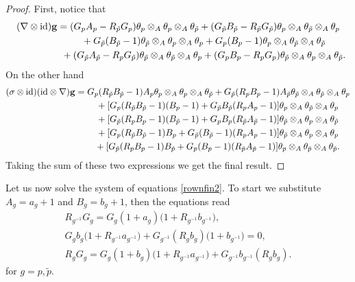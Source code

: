 \documentclass[10pt,a4paper]{amsart}
\numberwithin{equation}{section}
\newcommand{\ip}{{\tilde{p}}}
\begin{document}
\begin{proof}First, notice that
\begin{gather*}
(\nabla\otimes\mathrm{id}){\bf g} =
(G_pA_p - R_\ip G_p)\theta_p\otimes_A\theta_p\otimes_A\theta_\ip +(G_\ip B_\ip-R_\ip G_\ip)\theta_p\otimes_A\theta_\ip\otimes_A\theta_p \\
\hphantom{(\nabla\otimes\mathrm{id}){\bf g} =}{}
+G_\ip(B_\ip-1)\theta_\ip\otimes_A\theta_p\otimes_A\theta_p+G_p(B_p-1)\theta_p\otimes_A\theta_\ip\otimes_A\theta_\ip\\
\hphantom{(\nabla\otimes\mathrm{id}){\bf g} =}{} +(G_\ip A_\ip-R_pG_\ip)\theta_\ip\otimes_A\theta_\ip\otimes_A\theta_p+(G_p B_p-R_pG_p )\theta_\ip\otimes_A\theta_p\otimes_A\theta_\ip.
\end{gather*}
On the other hand
\begin{gather*}
(\sigma\otimes\mathrm{id})(\mathrm{id}\otimes\nabla){\bf g} =
G_p(R_\ip B_\ip -1)A_p\theta_p\otimes_A\theta_p\otimes_A\theta_\ip+G_\ip(R_p B_p -1)A_\ip\theta_\ip\otimes_A\theta_\ip\otimes_A\theta_p \\
\hphantom{(\sigma\otimes\mathrm{id})(\mathrm{id}\otimes\nabla){\bf g} =}{}
+ [G_p(R_\ip B_\ip -1)(B_p-1)+G_\ip B_\ip(R_p A_p -1) ]\theta_p\otimes_A\theta_\ip\otimes_A\theta_p \\
\hphantom{(\sigma\otimes\mathrm{id})(\mathrm{id}\otimes\nabla){\bf g} =}{}
+ [G_\ip(R_p B_p -1)(B_\ip-1)+G_p B_p(R_\ip A_\ip -1) ]\theta_\ip\otimes_A\theta_p\otimes_A\theta_\ip \\
\hphantom{(\sigma\otimes\mathrm{id})(\mathrm{id}\otimes\nabla){\bf g} =}{}
+ [G_p(R_\ip B_\ip-1) B_p+G_\ip (B_\ip-1)(R_p A_p -1) ]\theta_\ip\otimes_A\theta_p\otimes_A\theta_p \\
\hphantom{(\sigma\otimes\mathrm{id})(\mathrm{id}\otimes\nabla){\bf g} =}{}
+ [G_\ip(R_p B_p-1) B_\ip+G_p(B_p-1)(R_\ip A_\ip -1) ]\theta_p\otimes_A\theta_\ip\otimes_A\theta_\ip.
\end{gather*}
Taking the sum of these two expressions we get the final result.
\end{proof}



Let us now solve the system of equations \eqref{rownfin2}. To start we substitute $A_g=a_g+1$ and $B_g=b_g+1$, then the equations
read
\begin{gather}
R_{g^{-1}}G_g=G_g(1+a_g)\big(1+R_{g^{-1}}b_{g^{-1}}\big),\nonumber\\
G_gb_g\big(1+R_{g^{-1}}a_{g^{-1}}\big)+G_{g^{-1}}(R_gb_g)\big(1+b_{g^{-1}}\big)=0,\nonumber\\
R_gG_g=G_g(1+b_g)\big(1+R_{g^{-1}}a_{g^{-1}}\big)+G_{g^{-1}}b_{g^{-1}}(R_gb_g).\label{rownfin2a}
\end{gather}
for $g=p,\ip$.
\end{document}
